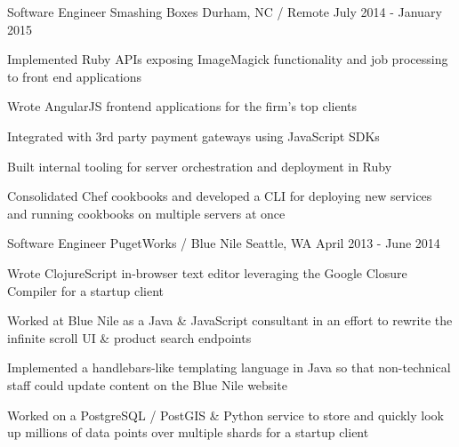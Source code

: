\begin{cventries}
  \cventry
    {Software Engineer} %
    {Smashing Boxes} %
    {Durham, NC / Remote} %
    {July 2014 - January 2015} %
    {
      \begin{cvitems} %
        \item {Implemented Ruby APIs exposing ImageMagick functionality and job processing to front end applications}
        \item {Wrote AngularJS frontend applications for the firm's top clients}
        \item {Integrated with 3rd party payment gateways using JavaScript SDKs}
        \item {Built internal tooling for server orchestration and deployment in Ruby}
        \item {Consolidated Chef cookbooks and developed a CLI for deploying new services and running cookbooks on multiple servers at once}
      \end{cvitems}
    }


  \cventry
    {Software Engineer} %
    {PugetWorks / Blue Nile} %
    {Seattle, WA} %
    {April 2013 - June 2014} %
    {
      \begin{cvitems} %
        \item {Wrote ClojureScript in-browser text editor leveraging the Google Closure Compiler for a startup client}
        \item {Worked at Blue Nile as a Java \& JavaScript consultant in an effort to rewrite the infinite scroll UI \& product search endpoints}
        \item {Implemented a handlebars-like templating language in Java so that non-technical staff could update content on the Blue Nile website}
        \item {Worked on a PostgreSQL / PostGIS \& Python service to store and quickly look up millions of data points over multiple shards for a startup client}
      \end{cvitems}
    }


\end{cventries}
